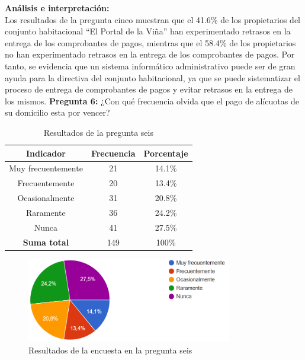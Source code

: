 \textbf{Análisis e interpretación:}\\
Los resultados de la pregunta cinco muestran que el 41.6\% de los propietarios del conjunto habitacional {\textquotedblleft}El Portal de la Viña{\textquotedblright} han experimentado retrasos en la entrega de los comprobantes de pagos, mientras que el 58.4\% de los propietarios no han experimentado retrasos en la entrega de los comprobantes de pagos.
Por tanto, se evidencia que un sistema informático administrativo puede ser de gran ayuda para la directiva del conjunto habitacional, ya que se puede sistematizar el proceso de entrega de comprobantes de pagos y evitar retrasos en la entrega de los mismos.
\bigbreak
\textbf{Pregunta 6:} ¿Con qué frecuencia olvida que el pago de alícuotas de su domicilio esta por vencer?

\begin{table}[H]
        \centering
        \caption{Resultados de la pregunta seis}
        \begin{footnotesize}
        \begin{tabular}{|c|c|c|}
            \hline
            \textbf{Indicador} & \textbf{Frecuencia} &  \textbf{Porcentaje} \\
            \hline
            Muy frecuentemente & 21 & 14.1\% \\
            \hline
            Frecuentemente & 20 & 13.4\% \\
            \hline
            Ocasionalmente & 31 & 20.8\% \\
            \hline
            Raramente & 36 & 24.2\% \\
            \hline
            Nunca & 41 & 27.5\% \\
            \hline
            \textbf{Suma total} & 149 & 100\% \\
            \hline
        \end{tabular}\label{tab:table_preg_6}
        \end{footnotesize}
    \end{table}

    \begin{figure}[H]
        \centering
        \includegraphics[width=0.8\textwidth]{resources/images/p6}
        \caption{Resultados de la encuesta en la pregunta seis}\label{fig:figure_p6}
    \end{figure}

